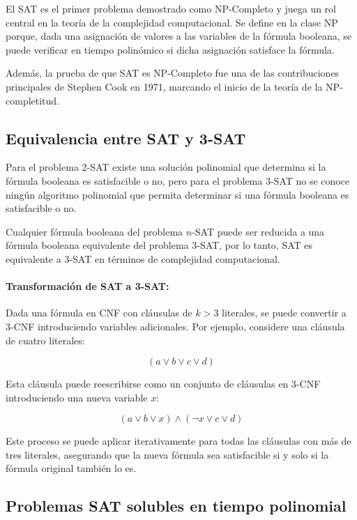\documentclass{article}
\begin{document}
El SAT es el primer problema demostrado como NP-Completo \cite{authomataTheory} y juega un rol central en la teoría de la complejidad computacional. Se define en la clase NP porque, dada una asignación de valores a las variables de la fórmula booleana, se puede verificar en tiempo polinómico si dicha asignación satisface la fórmula.

Además, la prueba de que SAT es NP-Completo fue una de las contribuciones principales de Stephen Cook en 1971, marcando el inicio de la teoría de la NP-completitud.

\subsection{Equivalencia entre SAT y 3-SAT}

Para el problema 2-SAT existe una solución polinomial que determina si la fórmula booleana es satisfacible o no, pero para el problema 3-SAT no se conoce ningún algoritmo polinomial que permita
determinar si una fórmula booleana es satisfacible o no.

Cualquier fórmula booleana del problema $n$-SAT puede ser reducida a una fórmula booleana equivalente del problema 3-SAT, por lo tanto, SAT es equivalente a 3-SAT en términos de complejidad computacional.

\paragraph{Transformación de SAT a 3-SAT:}

Dada una fórmula en CNF con cláusulas de \( k > 3 \) literales, se puede convertir a 3-CNF introduciendo variables adicionales. Por ejemplo, considere una cláusula de cuatro literales:

\[
      (a \vee b \vee c \vee d)
\]

Esta cláusula puede reescribirse como un conjunto de cláusulas en 3-CNF introduciendo una nueva variable \( x \):

\[
      (a \vee b \vee x) \wedge (\neg x \vee c \vee d)
\]

Este proceso se puede aplicar iterativamente para todas las cláusulas con más de tres literales, asegurando que la nueva fórmula sea satisfacible si y solo si la fórmula original también lo es.

\subsection{Problemas SAT solubles en tiempo polinomial}
\end{document}
